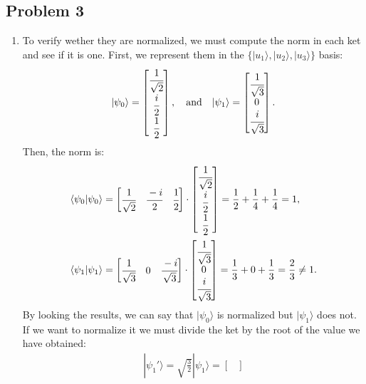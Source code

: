\documentclass[letterpaper,11pt,twoside]{article}
\newcommand{\ket}[1]{|#1\rangle}
\newcommand{\braket}[1]{\langle#1\rangle}
\begin{document}
\subsection*{Problem 3}
\begin{enumerate}[itemsep=0pt,topsep=0pt,label=\alph*.]
  \item To verify wether they are normalized, we must compute the norm in each ket and see if it is one. First, we represent them in the $\{\ket{u_1},\ket{u_2},\ket{u_3}\}$ basis:
  \begin{align*}
    \ket{\psi_0}=\begin{bmatrix}
      \cfrac{1}{\sqrt{2}}\\\cfrac{i}{2}\\\cfrac{1}{2}
    \end{bmatrix},\quad\text{and}\quad
    \ket{\psi_1}=\begin{bmatrix}
      \cfrac{1}{\sqrt{3}}\\0\\\cfrac{i}{\sqrt{3}}
    \end{bmatrix}.
  \end{align*} 
  Then, the norm is:
  \begin{align*}
    \braket{\psi_0|\psi_0}&=\begin{bmatrix}
      \cfrac{1}{\sqrt{2}}&\cfrac{-i}{2}&\cfrac{1}{2}
    \end{bmatrix}\cdot\begin{bmatrix}
      \cfrac{1}{\sqrt{2}}\\\cfrac{i}{2}\\\cfrac{1}{2}
    \end{bmatrix}=\frac{1}{2}+\frac{1}{4}+\frac{1}{4}=1,\\
    \braket{\psi_1|\psi_1}&=\begin{bmatrix}
      \cfrac{1}{\sqrt{3}}&0&\cfrac{-i}{\sqrt{3}}
    \end{bmatrix}\cdot\begin{bmatrix}
      \cfrac{1}{\sqrt{3}}\\0\\\cfrac{i}{\sqrt{3}}
    \end{bmatrix}=\frac{1}{3}+0+\frac{1}{3}=\frac{2}{3}\neq1.
  \end{align*}
  By looking the results, we can say that $\ket{\psi_0}$ is normalized but $\ket{\psi_1}$ does not. If we want to normalize it we must divide the ket by the root of the value we have obtained:
  \begin{align*}
    \ket{\psi_1'}=\sqrt{\frac{3}{2}}\ket{\psi_1}=\begin{bmatrix}

\end{bmatrix}
\end{align*}
\end{enumerate}
\end{document}
